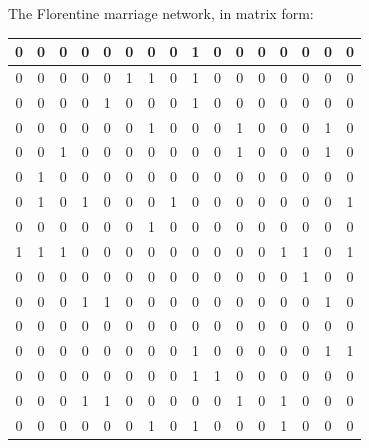 \documentclass[compress, 9pt]{beamer}
\begin{document}
{The Florentine marriage network, in matrix form:
{\tiny
\begin{table}[htdp]
\begin{center}\begin{tabular}{|c|c|c|c|c|c|c|c|c|c|c|c|c|c|c|c|}
\hline 
0 & 0 & 0 &     0 &     0 &     0 &     0 &     0 &     1&      0 &      0 &      0 &      0 & 0 &      0 &      0 \\ \hline
0 & 0 &     0 &     0 &     0 &     1&     1&     0 &     1&      0 &      0 &      0 & 0 &      0 &      0 &      0 \\  \hline
0 & 0 &     0 &     0 &     1&     0 &     0 &     0 &     1&      0 &      0 &      0 & 0 &      0 &      0 &      0 \\  \hline
0 & 0 &     0 &     0 &     0 &     0 &     1&     0 &     0 &      0 &      1&      0 & 0 &      0 &      1&      0 \\  \hline
0 & 0 &     1&     0 &     0 &     0 &     0 &     0 &     0 &      0 &      1&      0 & 0 &      0 &      1&      0 \\  \hline
0 & 1&     0 &     0 &     0 &     0 &     0 &     0 &     0 &      0 &      0 &      0 & 0 &      0 &      0 &      0 \\   \hline
0 & 1&     0 &     1&     0 &     0 &     0 &     1&     0 &      0 &      0 &      0 &  0 &      0 &      0 &      1 \\  \hline
0 & 0 &     0 &     0 &     0 &     0 &     1&     0 &     0 &      0 &      0 &      0 & 0 &      0 &      0 &      0 \\  \hline
1& 1&     1&     0 &     0 &     0 &     0 &     0 &     0 &      0 &      0 &      0 &  1&      1&      0 &      1\\  \hline
0 & 0 &     0 &     0 &     0 &     0 &     0 &     0 &     0 &      0 &      0 &      0 & 0 &      1&      0 &      0 \\  \hline
0 &0 &     0 &     1&     1&     0 &     0 &     0 &     0 &      0 &      0 &      0 &    0 &      0 &      1&      0 \\  \hline
0 & 0 &     0 &     0 &     0 &     0 &     0 &     0 &     0 &      0 &      0 &      0 & 0 &      0 &      0 &      0 \\  \hline
0 & 0 &     0 &     0 &     0 &     0 &     0 &     0 &     1&      0 &      0 &      0 & 0 &      0 &      1&      1\\  \hline
0 & 0 &     0 &     0 &     0 &     0 &     0 &     0 &     1&      1&      0 &      0 & 0 &      0 &      0 &      0 \\   \hline
0 & 0 &     0 &     1&     1&     0 &     0 &     0 &     0 &      0 &      1&      0 &   1&      0 &      0 &      0 \\  \hline
0 & 0 &     0 &     0 &     0 &     0 &     1&     0 &     1&      0 &      0 &      0 & 1&      0 &      0 &      0\\ 
\hline \end{tabular} 
\end{center}
\label{defaulttable}
\end{table}
}
}
\end{document}
